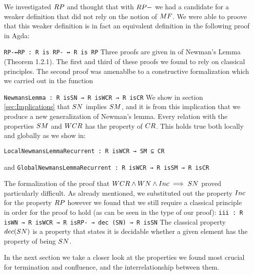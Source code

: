 We investigated $\RP$ and thought that with $\RPm$ we had a candidate for a weaker definition that 
did not rely on the notion of $\MF$. We were able to proove that this weaker definition is 
in fact an equivalent definition in the following proof in Agda: 

\verb|RP-↔RP : R is RP- ↔ R is RP| \footnotemark[1]
Three proofs are given in \terese of Newman's Lemma (Theorem 1.2.1). The first and third of 
these proofs we found to rely on classical principles. The second proof was amenablbe to a 
constructive formalization which we carried out in the function 


\verb|NewmansLemma : R isSN → R isWCR → R isCR| \footnotemark[2]
We show in section \ref{sec:Implications} that $\SN$ implies $\SM$, and it is from this implication 
that we produce a new generalization of Newman's lemma. Every relation with the properties 
$\SM$ and $\WCR$ has the property of $\CR$. This holds true both locally and globally as we show in:

\verb|LocalNewmansLemmaRecurrent : R isWCR → SM ⊆ CR| \footnotemark[2]

and \verb|GlobalNewmansLemmaRecurrent : R isWCR → R isSM → R isCR| \footnotemark[2]

The formalization of the proof that $\WCR \land \WN \land \Inc \implies \SN$ proved particularly difficult. 
As already mentioned, we substituted out the property $\Inc$ for the property $\RP$ however 
we found that we still require a classical principle in order for the proof to hold (as can be seen in the type of our proof):
\verb|iii : R isWN → R isWCR → R isRP- → dec (SN) → R isSN| \footnotemark[3] 
The classical property $\decSN$ is a property that states it is decidable whether a given 
element has the property of being $\SN$. 

In the next section we take a closer look at the properties we found most crucial for termination and confluence, and the interrelationship between them.

